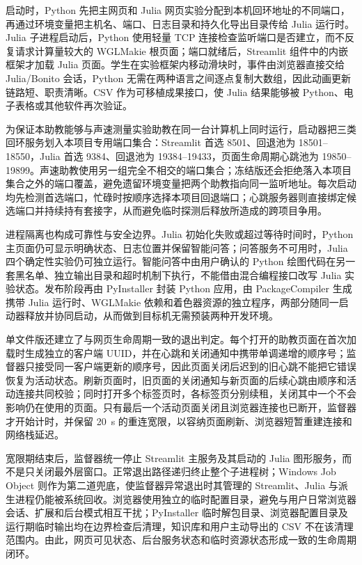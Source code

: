\documentclass[UTF8,a4paper,zihao=-4]{ctexart}
\begin{document}
\begin{sloppypar}
启动时，Python 先把主网页和 Julia 网页实验分配到本机回环地址的不同端口，再通过环境变量把主机名、端口、日志目录和持久化导出目录传给 Julia 运行时。Julia 子进程启动后，Python 使用轻量 TCP 连接检查监听端口是否建立，而不反复请求计算量较大的 WGLMakie 根页面；端口就绪后，Streamlit 组件中的内嵌框架才加载 Julia 页面。学生在实验框架内移动滑块时，事件由浏览器直接交给 Julia/Bonito 会话，Python 无需在两种语言之间逐点复制大数组，因此动画更新链路短、职责清晰。CSV 作为可移植成果接口，使 Julia 结果能够被 Python、电子表格或其他软件再次验证。
\end{sloppypar}

为保证本助教能够与声速测量实验助教在同一台计算机上同时运行，启动器把三类回环服务划入本项目专用端口集合：Streamlit 首选 8501、回退池为 18501--18550，Julia 首选 9384、回退池为 19384--19433，页面生命周期心跳池为 19850--19899。声速助教使用另一组完全不相交的端口集合；冻结版还会拒绝落入本项目集合之外的端口覆盖，避免遗留环境变量把两个助教指向同一监听地址。每次启动均先检测首选端口，忙碌时按顺序选择本项目回退端口；心跳服务器则直接绑定候选端口并持续持有套接字，从而避免临时探测后释放所造成的跨项目争用。

进程隔离也构成可靠性与安全边界。Julia 初始化失败或超过等待时间时，Python 主页面仍可显示明确状态、日志位置并保留智能问答；问答服务不可用时，Julia 四个确定性实验仍可独立运行。智能问答中由用户确认的 Python 绘图代码在另一套黑名单、独立输出目录和超时机制下执行，不能借由混合编程接口改写 Julia 实验状态。发布阶段再由 PyInstaller 封装 Python 应用，由 PackageCompiler 生成携带 Julia 运行时、WGLMakie 依赖和着色器资源的独立程序，两部分随同一启动器释放并协同启动，从而做到目标机无需预装两种开发环境。

单文件版还建立了与网页生命周期一致的退出判定。每个打开的助教页面在首次加载时生成独立的客户端 UUID，并在心跳和关闭通知中携带单调递增的顺序号；监督器只接受同一客户端更新的顺序号，因此页面关闭后迟到的旧心跳不能把它错误恢复为活动状态。刷新页面时，旧页面的关闭通知与新页面的后续心跳由顺序和活动连接共同校验；同时打开多个标签页时，各标签页分别续租，关闭其中一个不会影响仍在使用的页面。只有最后一个活动页面关闭且浏览器连接也已断开，监督器才开始计时，并保留 20~s 的重连宽限，以容纳页面刷新、浏览器短暂重建连接和网络栈延迟。

宽限期结束后，监督器统一停止 Streamlit 主服务及其启动的 Julia 图形服务，而不是只关闭最外层窗口。正常退出路径递归终止整个子进程树；Windows Job Object 则作为第二道兜底，使监督器异常退出时其管理的 Streamlit、Julia 与派生进程仍能被系统回收。浏览器使用独立的临时配置目录，避免与用户日常浏览器会话、扩展和后台模式相互干扰；PyInstaller 临时解包目录、浏览器配置目录及运行期临时输出均在边界检查后清理，知识库和用户主动导出的 CSV 不在该清理范围内。由此，网页可见状态、后台服务状态和临时资源状态形成一致的生命周期闭环。
\end{document}
